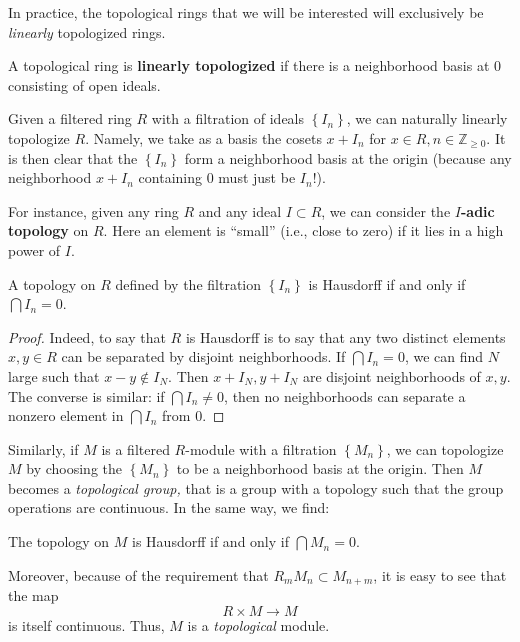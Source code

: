 In practice, the topological rings that we will be interested will exclusively
be \emph{linearly} topologized rings.

\begin{definition} 
A topological ring is \textbf{linearly topologized} if there is a neighborhood
basis at $0$ consisting of open ideals.
\end{definition} 

Given a filtered ring $R$ with a filtration of ideals $\left\{I_n\right\}$, we
can naturally linearly topologize $R$. Namely, we take as a basis the cosets
$x+I_n$ for $x \in R, n \in \mathbb{Z}_{\geq 0}$. 
It is then clear that the $\left\{I_n\right\}$ form a neighborhood basis at
the origin (because any neighborhood $x+I_n$ containing $0$ must just be
$I_n$!). 

\begin{example} 
For instance, given any ring $R$ and any ideal $I \subset R$, we can consider
the \textbf{$I$-adic topology} on $R$. Here an element is ``small'' (i.e.,
close to zero) if it lies in a high power of $I$.
\end{example} 


\begin{proposition} 
A topology on $R$ defined by the filtration $\left\{I_n\right\}$ is Hausdorff
if and only if $\bigcap I_n = 0$.
\end{proposition} 
\begin{proof} 
Indeed, to say that $R$ is Hausdorff is to say that any two distinct elements
$x,y \in R$ can be separated by disjoint neighborhoods. If $\bigcap I_n = 0$,
we can find $N$ large such that $x -y \notin I_N$. Then $x+I_N, y + I_N$ are
disjoint neighborhoods of $x,y$. 
The converse is similar: if $\bigcap I_n \neq 0$, then no neighborhoods can
separate a nonzero element in $\bigcap I_n$ from $0$.
\end{proof} 

Similarly, if $M$ is a filtered $R$-module with a filtration
$\left\{M_n\right\}$, we can topologize $M$ by choosing the
$\left\{M_n\right\}$ to be a neighborhood basis at the origin.  Then $M$
becomes a \emph{topological group,} that is a group with a topology such that
the group operations are continuous.
In the same way, we find:

\begin{proposition} 
The topology on $M$ is Hausdorff if and only if $\bigcap M_n = 0$.
\end{proposition} 

Moreover, because of the requirement that $R_m M_{n}  \subset M_{n+m}$, it is
easy to see that the map
\[ R \times M \to M  \]
is itself continuous. Thus, $M$ is a \emph{topological} module.

